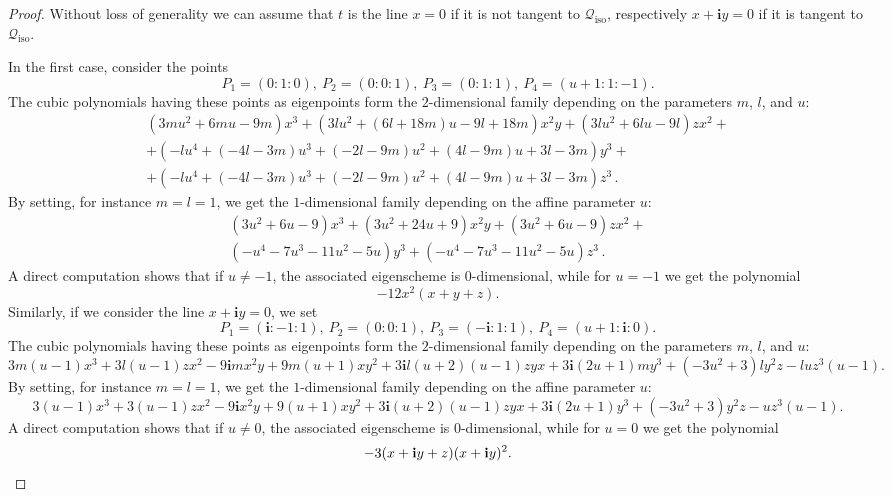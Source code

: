 \documentclass{amsart}
\theoremstyle{plain}
\theoremstyle{definition}
\newcommand{\iso}{\mathcal{Q}_{\mathrm{iso}}}
\newcommand{\iii}{\textbf{i}}
\begin{document}
\begin{proof}
    Without loss of generality we can assume that $t$ is the line $x=0$ if it is not tangent to $\iso$, respectively $x+\iii y=0$ if it is tangent to $\iso$.

    In the first case, consider the points
    \[
    P_1=(0:1:0), \ P_2=(0:0:1), \ P_3=(0:1:1), \ P_4=(u+1:1:-1).
    \]
    The cubic polynomials having these points as eigenpoints form the $2$-dimensional family depending on the parameters $m$, $l$, and $u$:
    \begin{multline*}
    (3mu^2 + 6mu - 9m) x^3 + (3 l u^2+(6l + 18m)u - 9l + 18m) x^2 y + (3lu^2 + 6lu - 9l) z x^2 + \\
    +(-l u^4+(-4 l-3 m) u^3+(-2 l-9 m) u^2+(4 l-9 m) u + 3 l-3 m) y^3+ \\
    +(-l u^4 + (-4 l-3 m)u^3 + (-2l - 9m) u^2 + (4l - 9m)u + 3l - 3m) z^3 \,.
    \end{multline*}
    By setting, for instance $m=l=1$, we get the $1$-dimensional family depending on the affine parameter $u$:
    \begin{multline*}
    (3 u^2+6 u-9) x^3+(3 u^2+24 u+9) x^2 y+(3 u^2+6 u-9) z x^2+\\
    (-u^4-7 u^3-11 u^2-5 u) y^3+(-u^4-7 u^3-11 u^2-5 u) z^3 \,.
    \end{multline*}
    A direct computation shows that if $u \neq -1$, the associated eigenscheme is $0$-dimensional, while for $u=-1$ we get the polynomial
    \[
     -12 x^2 (x+ y+ z).
    \]
    Similarly, if we consider the line $x+\iii y=0$, we set
    \[
    P_1=(\iii:-1:1), \ P_2=(0:0:1), \ P_3=(-\iii:1:1), \ P_4=(u+1: \iii:0).
    \]
    The cubic polynomials having these points as eigenpoints form the $2$-dimensional family depending on the parameters $m$, $l$, and $u$:
$$
3m(u-1)x^3+3l(u-1)zx^2-9\iii mx^2y+9m(u+1) xy^2+3 \iii l(u+2)(u-1)zyx+3\iii (2u+1)my^3+(-3u^2+3)ly^2 z-l u z^3 (u-1).
$$
By setting, for instance $m=l=1$, we get the $1$-dimensional family depending on the affine parameter $u$:
$$
3(u-1)x^3+3(u-1)zx^2-9\iii x^2y+9(u+1) xy^2+3 \iii (u+2)(u-1)zyx+3\iii (2u+1)y^3+(-3u^2+3)y^2 z- u z^3 (u-1).
$$
A direct computation shows that if $u \neq 0$, the associated eigenscheme is $0$-dimensional, while for $u=0$ we get the polynomial
\[
-3(x+\iii y+z)(x+\iii y)^2. \qedhere
\]
\end{proof}
\end{document}
